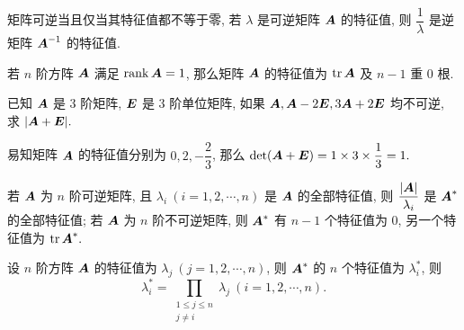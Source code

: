\begin{theorem}[逆矩阵的特征值]
    矩阵可逆当且仅当其特征值都不等于零, 若 $\lambda$ 是可逆矩阵 $\vb*{A}$ 的特征值, 则 $\dfrac{1}{\lambda}$ 是逆矩阵 $\vb*{A}^{-1}$ 的特征值.
\end{theorem}

\begin{theorem}[秩一矩阵的特征值]
    若 $n$ 阶方阵 $\vb*{A}$ 满足 $\rank\vb*{A}=1$, 那么矩阵 $\vb*{A}$ 的特征值为 $\tr\vb*{A}$ 及 $n-1$ 重 0 根.
\end{theorem}

\begin{example}
    已知 $\vb*{A}$ 是 3 阶矩阵, $\vb*{E}$ 是 3 阶单位矩阵, 如果 $\vb*{A},\vb*{A}-2\vb*{E},3\vb*{A}+2\vb*{E}$ 均不可逆, 求 $|\vb*{A}+\vb*{E}|.$
\end{example}
\begin{solution}
    易知矩阵 $\vb*{A}$ 的特征值分别为 $0,2,-\dfrac{2}{3}$, 那么 $\det(\vb*{A}+\vb*{E})=1\times3\times\dfrac{1}{3}=1.$
\end{solution}

\begin{theorem}[伴随矩阵的特征值 A]
    若 $\vb*{A}$ 为 $n$ 阶可逆矩阵, 且 $\lambda_i~ (i=1,2,\cdots,n)$ 是 $\vb*{A}$ 的全部特征值, 则 $\dfrac{|\vb*{A}|}{\lambda_i}$ 是 $\vb*{A}^*$ 的全部特征值; 
    若 $\vb*{A}$ 为 $n$ 阶不可逆矩阵, 则 $\vb*{A}^*$ 有 $n-1$ 个特征值为 0, 另一个特征值为 $\tr\vb*{A}^*.$
\end{theorem}

\begin{theorem}[伴随矩阵的特征值 B]
    \label{bsjzdtzzB}设 $n$ 阶方阵 $\vb*{A}$ 的特征值为 $\lambda_j~ (j=1,2,\cdots,n)$, 则 $\vb*{A}^*$ 的 $n$ 个特征值为 $\lambda_i^*$, 则
    $$\lambda_i^*=\prod_{\substack{1\leqslant j\leqslant n\\j\neq i}}\lambda_j~  (i=1,2,\cdots,n).$$
\end{theorem}

